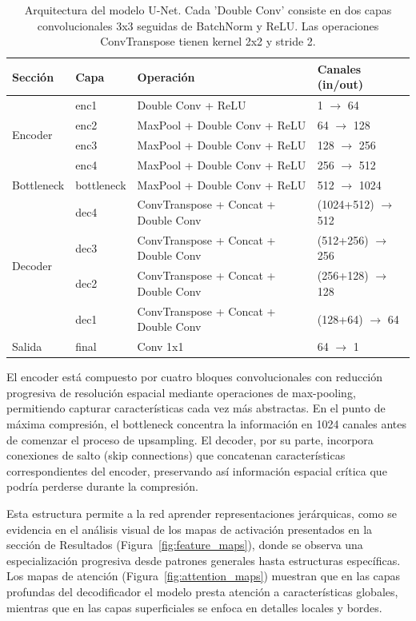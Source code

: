 \begin{table}[htbp]
    \centering
    \begin{tabular}{llll}
    \hline
    \textbf{Sección} & \textbf{Capa} & \textbf{Operación} & \textbf{Canales (in/out)} \\
    \hline
    \multirow{4}{*}{Encoder} 
    & enc1 & Double Conv + ReLU & 1 $\rightarrow$ 64 \\
    & enc2 & MaxPool + Double Conv + ReLU & 64 $\rightarrow$ 128 \\
    & enc3 & MaxPool + Double Conv + ReLU & 128 $\rightarrow$ 256 \\
    & enc4 & MaxPool + Double Conv + ReLU & 256 $\rightarrow$ 512 \\
    \hline
    Bottleneck & bottleneck & MaxPool + Double Conv + ReLU & 512 $\rightarrow$ 1024 \\
    \hline
    \multirow{4}{*}{Decoder}
    & dec4 & ConvTranspose + Concat + Double Conv & (1024+512) $\rightarrow$ 512 \\
    & dec3 & ConvTranspose + Concat + Double Conv & (512+256) $\rightarrow$ 256 \\
    & dec2 & ConvTranspose + Concat + Double Conv & (256+128) $\rightarrow$ 128 \\
    & dec1 & ConvTranspose + Concat + Double Conv & (128+64) $\rightarrow$ 64 \\
    \hline
    Salida & final & Conv 1x1 & 64 $\rightarrow$ 1 \\
    \hline
    \end{tabular}
    \caption{Arquitectura del modelo U-Net. Cada 'Double Conv' consiste en dos capas convolucionales 3x3 seguidas de BatchNorm y ReLU. Las operaciones ConvTranspose tienen kernel 2x2 y stride 2.}
    \label{tab:unet_architecture}
\end{table}

El encoder está compuesto por cuatro bloques convolucionales con reducción progresiva de resolución espacial mediante operaciones de max-pooling, permitiendo capturar características cada vez más abstractas. En el punto de máxima compresión, el bottleneck concentra la información en 1024 canales antes de comenzar el proceso de upsampling. El decoder, por su parte, incorpora conexiones de salto (skip connections) que concatenan características correspondientes del encoder, preservando así información espacial crítica que podría perderse durante la compresión.

Esta estructura permite a la red aprender representaciones jerárquicas, como se evidencia en el análisis visual de los mapas de activación presentados en la sección de Resultados (Figura~\ref{fig:feature_maps}), donde se observa una especialización progresiva desde patrones generales hasta estructuras específicas. Los mapas de atención (Figura~\ref{fig:attention_maps}) muestran que en las capas profundas del decodificador el modelo presta atención a características globales, mientras que en las capas superficiales se enfoca en detalles locales y bordes.

